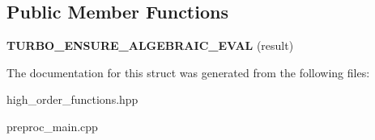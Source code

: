 \subsection*{Public Member Functions}
\begin{DoxyCompactItemize}
\item 
\hypertarget{structtml_1_1impl_1_1filter__impl_3_01F_00_01tml_1_1list_3_01HEAD_00_01TAIL_8_8_8_4_00_01tml_1_1list_3_01PASSED_8_8_8_4_01_4_a437798f499cc0035ad26d2d11630a064}{{\bfseries T\+U\+R\+B\+O\+\_\+\+E\+N\+S\+U\+R\+E\+\_\+\+A\+L\+G\+E\+B\+R\+A\+I\+C\+\_\+\+E\+V\+A\+L} (result)}\label{structtml_1_1impl_1_1filter__impl_3_01F_00_01tml_1_1list_3_01HEAD_00_01TAIL_8_8_8_4_00_01tml_1_1list_3_01PASSED_8_8_8_4_01_4_a437798f499cc0035ad26d2d11630a064}

\end{DoxyCompactItemize}


The documentation for this struct was generated from the following files\+:\begin{DoxyCompactItemize}
\item 
high\+\_\+order\+\_\+functions.\+hpp\item 
preproc\+\_\+main.\+cpp\end{DoxyCompactItemize}
